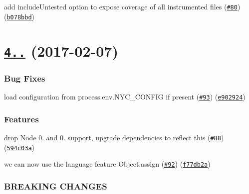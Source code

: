 \begin{DoxyItemize}
\item add include\+Untested option to expose coverage of all instrumented files (\href{https://github.com/istanbuljs/babel-plugin-istanbul/issues/80}{\tt \#80}) (\href{https://github.com/istanbuljs/babel-plugin-istanbul/commit/b078bbd}{\tt b078bbd})
\end{DoxyItemize}

\label{_4.0.0}%
 \section*{\href{https://github.com/istanbuljs/babel-plugin-istanbul/compare/v3.1.2...v4.0.0}{\tt 4..} (2017-\/02-\/07)}

\subsubsection*{Bug Fixes}


\begin{DoxyItemize}
\item load configuration from process.\+env.\+N\+Y\+C\+\_\+\+C\+O\+N\+F\+IG if present (\href{https://github.com/istanbuljs/babel-plugin-istanbul/issues/93}{\tt \#93}) (\href{https://github.com/istanbuljs/babel-plugin-istanbul/commit/e902924}{\tt e902924})
\end{DoxyItemize}

\subsubsection*{Features}


\begin{DoxyItemize}
\item drop Node 0. and 0. support, upgrade dependencies to reflect this (\href{https://github.com/istanbuljs/babel-plugin-istanbul/issues/88}{\tt \#88}) (\href{https://github.com/istanbuljs/babel-plugin-istanbul/commit/594c03a}{\tt 594c03a})
\item we can now use the language feature Object.\+assign (\href{https://github.com/istanbuljs/babel-plugin-istanbul/issues/92}{\tt \#92}) (\href{https://github.com/istanbuljs/babel-plugin-istanbul/commit/f77db2a}{\tt f77db2a})
\end{DoxyItemize}

\subsubsection*{B\+R\+E\+A\+K\+I\+NG C\+H\+A\+N\+G\+ES}



